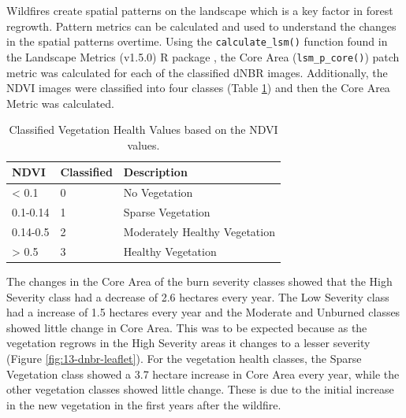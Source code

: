 \documentclass[
]{book}
\begin{document}
Wildfires create spatial patterns on the landscape which is a key factor in forest regrowth. Pattern metrics can be calculated and used to understand the changes in the spatial patterns overtime. Using the \texttt{calculate\_lsm()} function found in the Landscape Metrics (v1.5.0) R package \citep{hesselbarth_landscapemetrics_2019}, the Core Area (\texttt{lsm\_p\_core()}) patch metric was calculated for each of the classified dNBR images. Additionally, the NDVI images were classified into four classes (Table \ref{tab:13-murray-case-study-table-2}) and then the Core Area Metric was calculated.

\begin{table}

\caption{\label{tab:13-murray-case-study-table-2}Classified Vegetation Health Values based on the NDVI values.}
\centering
\begin{tabular}[t]{l|l|l}
\hline
NDVI & Classified & Description\\
\hline
< 0.1 & 0 & No Vegetation\\
\hline
0.1-0.14 & 1 & Sparse Vegetation\\
\hline
0.14-0.5 & 2 & Moderately Healthy Vegetation\\
\hline
> 0.5 & 3 & Healthy Vegetation\\
\hline
\end{tabular}
\end{table}

The changes in the Core Area of the burn severity classes showed that the High Severity class had a decrease of 2.6 hectares every year. The Low Severity class had a increase of 1.5 hectares every year and the Moderate and Unburned classes showed little change in Core Area. This was to be expected because as the vegetation regrows in the High Severity areas it changes to a lesser severity (Figure \ref{fig:13-dnbr-leaflet}). For the vegetation health classes, the Sparse Vegetation class showed a 3.7 hectare increase in Core Area every year, while the other vegetation classes showed little change. These is due to the initial increase in the new vegetation in the first years after the wildfire.
\end{document}
